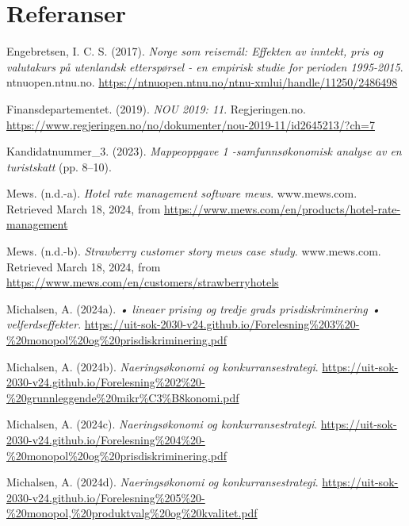 \documentclass[
  12pt,
  a4paper,
  DIV=11,
  numbers=noendperiod]{scrartcl}
\newlength{\cslhangindent}
\newenvironment{CSLReferences}[2] %
 {\begin{list}{}{%
  \setlength{\itemindent}{0pt}
  \setlength{\leftmargin}{0pt}
  \setlength{\parsep}{0pt}
  \ifodd #1
   \setlength{\leftmargin}{\cslhangindent}
   \setlength{\itemindent}{-1\cslhangindent}
  \fi
  \setlength{\itemsep}{#2\baselineskip}}}
 {\end{list}}
\begin{document}
\section{Referanser}\label{referanser}

\label{refs}
\begin{CSLReferences}{1}{0}
Engebretsen, I. C. S. (2017). \emph{Norge som reisemål: Effekten av
inntekt, pris og valutakurs på utenlandsk etterspørsel - en empirisk
studie for perioden 1995-2015}. ntnuopen.ntnu.no.
\url{https://ntnuopen.ntnu.no/ntnu-xmlui/handle/11250/2486498}

Finansdepartementet. (2019). \emph{NOU 2019: 11}. Regjeringen.no.
\url{https://www.regjeringen.no/no/dokumenter/nou-2019-11/id2645213/?ch=7}

Kandidatnummer\_3. (2023). \emph{Mappeoppgave 1 -samfunnsøkonomisk
analyse av en turistskatt} (pp. 8--10).

Mews. (n.d.-a). \emph{Hotel rate management software \textbar{} mews}.
www.mews.com. Retrieved March 18, 2024, from
\url{https://www.mews.com/en/products/hotel-rate-management}

Mews. (n.d.-b). \emph{Strawberry customer story \textbar{} mews case
study}. www.mews.com. Retrieved March 18, 2024, from
\url{https://www.mews.com/en/customers/strawberryhotels}

Michalsen, A. (2024a). \emph{• lineaer prising og tredje grads
prisdiskriminering • velferdseffekter}.
\url{https://uit-sok-2030-v24.github.io/Forelesning\%203\%20-\%20monopol\%20og\%20prisdiskriminering.pdf}

Michalsen, A. (2024b). \emph{Naeringsøkonomi og konkurransestrategi}.
\url{https://uit-sok-2030-v24.github.io/Forelesning\%202\%20-\%20grunnleggende\%20mikr\%C3\%B8konomi.pdf}

Michalsen, A. (2024c). \emph{Naeringsøkonomi og konkurransestrategi}.
\url{https://uit-sok-2030-v24.github.io/Forelesning\%204\%20-\%20monopol\%20og\%20prisdiskriminering.pdf}

Michalsen, A. (2024d). \emph{Naeringsøkonomi og konkurransestrategi}.
\url{https://uit-sok-2030-v24.github.io/Forelesning\%205\%20-\%20monopol,\%20produktvalg\%20og\%20kvalitet.pdf}


\end{CSLReferences}
\end{document}
